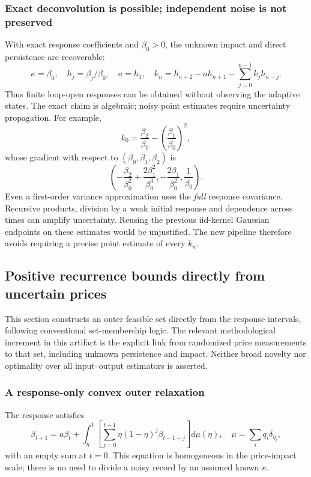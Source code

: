 \documentclass[10pt,twocolumn,letterpaper]{article}
\theoremstyle{definition}
\theoremstyle{remark}
\begin{document}
\subsubsection{Exact deconvolution is possible; independent noise is not preserved}
With exact response coefficients and $\beta_0>0$, the unknown impact and direct persistence are recoverable:
\begin{equation}
 \kappa=\beta_0,\quad h_j=\beta_j/\beta_0,\quad a=h_1,\quad
 k_n=h_{n+2}-a h_{n+1}-\sum_{j=0}^{n-1}k_jh_{n-j}.
 \label{eq:observable_deconvolution}
\end{equation}
Thus finite loop-open responses can be obtained without observing the adaptive states. The exact claim is algebraic; noisy point estimates require uncertainty propagation. For example,
\[
 k_0=\frac{\beta_2}{\beta_0}-\left(\frac{\beta_1}{\beta_0}\right)^2,
\]
whose gradient with respect to $(\beta_0,\beta_1,\beta_2)$ is
\[
 \left(-\frac{\beta_2}{\beta_0^2}+\frac{2\beta_1^2}{\beta_0^3},
 -\frac{2\beta_1}{\beta_0^2},\frac1{\beta_0}\right).
\]
Even a first-order variance approximation uses the \emph{full} response covariance. Recursive products, division by a weak initial response and dependence across times can amplify uncertainty. Reusing the previous iid-kernel Gaussian endpoints on these estimates would be unjustified. The new pipeline therefore avoids requiring a precise point estimate of every $k_n$.

\subsection{Positive recurrence bounds directly from uncertain prices}
\label{sec:observable_bounds}
This section constructs an outer feasible set directly from the response intervals, following conventional set-membership logic. The relevant methodological increment in this artifact is the explicit link from randomized price measurements to that set, including unknown persistence and impact. Neither broad novelty nor optimality over all input--output estimators is asserted.

\subsubsection{A response-only convex outer relaxation}
The response satisfies
\begin{equation}
 \beta_{t+1}=a\beta_t+\int_{\underline\eta}^{1}
 \left[\sum_{j=0}^{t-1}\eta(1-\eta)^j\beta_{t-1-j}\right]d\mu(\eta),
 \quad \mu=\sum_iq_i\delta_{\eta_i},
 \label{eq:public_recurrence}
\end{equation}
with an empty sum at $t=0$. This equation is homogeneous in the price-impact scale; there is no need to divide a noisy record by an assumed known $\kappa$.
\end{document}
